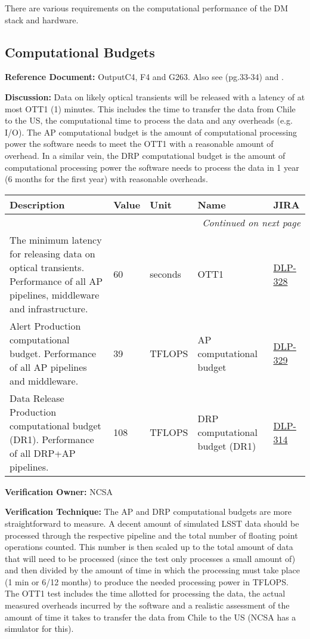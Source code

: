 \documentclass[DM,lsstdraft,toc]{lsstdoc}
\makeatletter
\newcommand{\jira}[1]{\href{https://jira.lsstcorp.org/browse/#1}{#1}}
\newenvironment{metric}[0]{%
\setlength\LTleft{0pt}
\setlength\LTright{\fill}
\begin{longtable}[]{@{}p{0.4\textwidth}lp{0.75in}p{1.3in}p{0.75in}@{}}

\hline \textbf{Description} & \textbf{Value} & \textbf{Unit} & \textbf{Name} & \textbf{JIRA} \\ \hline
\endhead

\hline \multicolumn{5}{r}{\emph{Continued on next page}} \\
\endfoot

\hline\hline
\endlastfoot
}{%
\hline
\end{longtable}
}
\makeatother
\begin{document}
There are various requirements on the computational performance of the
DM stack and hardware.

\subsection{Computational Budgets}\label{computational-budgets}

\textbf{Reference Document:} \textbar{}Output\textbar{}C4, F4 and
\textbar{}G263. Also see \SRD (pg.33-34) and .

\textbf{Discussion:} Data on likely optical transients will be released
with a latency of at most OTT1 (1) minutes. This includes the time to
transfer the data from Chile to the US, the computational time to
process the data and any overheads (e.g. I/O). The AP computational
budget is the amount of computational processing power the software
needs to meet the OTT1 with a reasonable amount of overhead. In a
similar vein, the DRP computational budget is the amount of
computational processing power the software needs to process the data in
1 year (6 months for the first year) with reasonable overheads.

\begin{metric}
The minimum latency for releasing data on optical transients.
Performance of all AP pipelines, middleware and infrastructure. & 60 &
seconds & OTT1 & \jira{DLP-328}\tabularnewline
Alert Production computational budget. Performance of all AP pipelines
and middleware. & 39 & TFLOPS & AP computational budget &
\jira{DLP-329}\tabularnewline
Data Release Production computational budget (DR1). Performance of all
DRP+AP pipelines. & 108 & TFLOPS & DRP computational budget (DR1) &
\jira{DLP-314}\tabularnewline
\end{metric}

\textbf{Verification Owner:} NCSA

\textbf{Verification Technique:} The AP and DRP computational budgets
are more straightforward to measure. A decent amount of simulated LSST
data should be processed through the respective pipeline and the total
number of floating point operations counted. This number is then scaled
up to the total amount of data that will need to be processed (since the
test only processes a small amount of) and then divided by the amount of
time in which the processing must take place (1 min or 6/12 months) to
produce the needed processing power in TFLOPS. The OTT1 test includes
the time allotted for processing the data, the actual measured overheads
incurred by the software and a realistic assessment of the amount of
time it takes to transfer the data from Chile to the US (NCSA has a
simulator for this).
\end{document}
